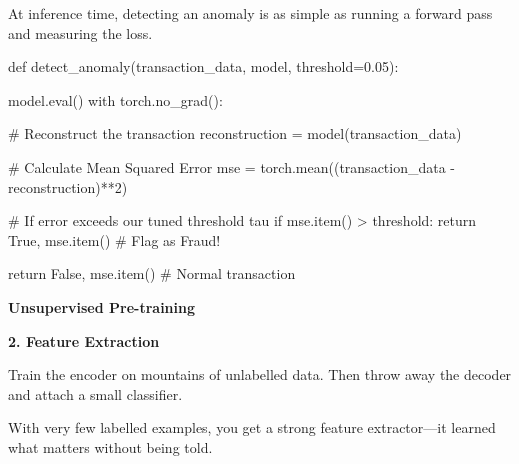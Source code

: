 \documentclass[11pt]{article}
\begin{document}
At inference time, detecting an anomaly is as simple as running a forward pass and measuring the loss.

\vspace{0.2in}

\begin{codebox}[inference.py]
def detect_anomaly(transaction_data, model, threshold=0.05):
    
    model.eval()
    with torch.no_grad():
        
        # Reconstruct the transaction
        reconstruction = model(transaction_data)
        
        # Calculate Mean Squared Error
        mse = torch.mean((transaction_data - reconstruction)**2)
        
        # If error exceeds our tuned threshold tau
        if mse.item() > threshold:
            return True, mse.item()  # Flag as Fraud!
            
        return False, mse.item()     # Normal transaction
\end{codebox}

\newpage


\vspace*{1.0in}

\begin{center}
{\fontsize{26}{30}\selectfont\color{brandnavy}\bfseries Unsupervised Pre-training}
\end{center}

\vspace{0.4in}

{\Large\color{brandnavy}\textbf{2. Feature Extraction}}

Train the encoder on mountains of unlabelled data. Then throw away the decoder and attach a small classifier. 

\vspace{0.2in}

With very few labelled examples, you get a strong feature extractor—it learned what matters without being told.

\vspace{0.6in}
\end{document}

